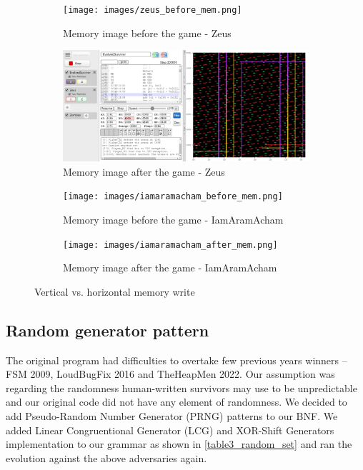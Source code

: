 \documentclass[dvipsnames,format=sigconf,anonymous=true,review=true]{acmart}
\begin{document}
\begin{figure}
  \centering
  \begin{subfigure}{0.48\textwidth}
    \texttt{[image: images/zeus\_before\_mem.png]}
    \caption{Memory image before the game - Zeus}
    \label{fig:mem_before1}
  \end{subfigure}
  \hfill
  \begin{subfigure}{0.48\textwidth}
    \includegraphics[width=\linewidth]{images/zeus_after_mem.png}
    \caption{Memory image after the game - Zeus}
    \label{fig:mem_after1}
  \end{subfigure}
    \begin{subfigure}{0.48\textwidth}
    \texttt{[image: images/iamaramacham\_before\_mem.png]}
    \caption{Memory image before the game - IamAramAcham}
    \label{fig:mem_before2}
  \end{subfigure}
  \hfill
  \begin{subfigure}{0.48\textwidth}
    \texttt{[image: images/iamaramacham\_after\_mem.png]}
    \caption{Memory image after the game - IamAramAcham}
    \label{fig:mem_after2}
  \end{subfigure}
  \caption{Vertical vs. horizontal memory write}
  \label{fig:vertical}
\end{figure}


 \subsection{Random generator pattern}
 The original program had difficulties to overtake few previous years winners -- FSM 2009, LoudBugFix 2016 and TheHeapMen 2022. Our assumption was regarding the randomness human-written survivors may use to be unpredictable and our original code did not have any element of randomness. We decided to add Pseudo-Random Number Generator (PRNG) patterns to our BNF.
 We added Linear Congruentional Generator (LCG) and XOR-Shift Generators implementation to our grammar as shown in \autoref{table3_random_set} and ran the evolution against the above adversaries again.
\end{document}
